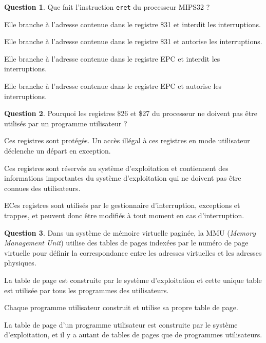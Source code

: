 \documentclass[11pt,english,french]{scrreprt}
\theoremstyle{remark}
\theoremstyle{definition}
\newtheorem{ques}{Question}[section]
\begin{document}
\begin{ques}
	Que fait l'instruction \lstinline!eret! du processeur MIPS32 ?
\begin{description}
	\setlength{\itemsep}{2pt}
	\setlength{\parskip}{-1pt}
	\setlength{\parsep}{-1pt}
	\item[\Square] Elle branche à l'adresse contenue dans le registre \$31 et interdit les interruptions.
	\item[\Square] Elle branche à l'adresse contenue dans le registre \$31 et autorise les interruptions.
	\item[\Square] Elle branche à l'adresse contenue dans le registre EPC et interdit les interruptions.
	\item[\CheckedBox] Elle branche à l'adresse contenue dans le registre EPC et autorise les interruptions.
\end{description}
\end{ques}

\begin{ques}
	Pourquoi les registres \$26 et \$27 du processeur ne doivent pas être utilisés par un programme utilisateur ?
\begin{description}
	\setlength{\itemsep}{2pt}
	\setlength{\parskip}{-1pt}
	\setlength{\parsep}{-1pt}
	\item[\Square] Ces registres sont protégés. Un accès illégal à ces registres en mode utilisateur déclenche un départ en exception.
	\item[\Square] Ces registres sont réservés au système d'exploitation et contiennent des informations importantes du système d'exploitation qui ne doivent pas être connues des utilisateurs.
	\item[\CheckedBox] ECes registres sont utilisés par le gestionnaire d'interruption, exceptions et trappes, et peuvent donc être modifiés à tout moment en cas d'interruption.
\end{description}
\end{ques}

\begin{ques}
	Dans un système de mémoire virtuelle paginée, la MMU (\emph{Memory Management Unit}) utilise des tables de pages indexées par le numéro de page virtuelle pour définir la correspondance entre les adresses virtuelles et les adresses physiques.
\begin{description}
	\setlength{\itemsep}{2pt}
	\setlength{\parskip}{-1pt}
	\setlength{\parsep}{-1pt}
	\item[\Square] La table de page est construite par le système d'exploitation et cette unique table est utilisée par tous les programmes des utilisateurs.
	\item[\Square] Chaque programme utilisateur construit et utilise sa propre table de page.
	\item[\CheckedBox] La table de page d'un programme utilisateur est construite par le système d'exploitation, et il y a autant de tables de pages que de programmes utilisateurs.
\end{description}
\end{ques}
\end{document}

